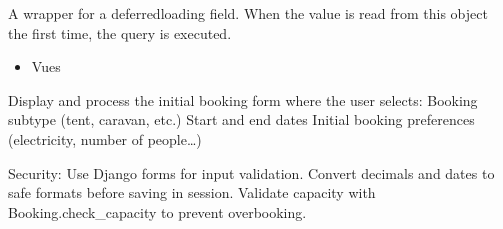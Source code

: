 \documentclass[letterpaper,10pt,english]{sphinxmanual}
\begin{document}
\begin{fulllineitems}
\begin{fulllineitems}
\label{\detokenize{index:bookings.models.SupplementMobileHomeTranslation.mobile_home_deposit}}
\pysigstartsignatures
\pysigline
{}
\pysigstopsignatures
\sphinxAtStartPar
A wrapper for a deferred\sphinxhyphen{}loading field. When the value is read from this
object the first time, the query is executed.

\end{fulllineitems}


\begin{fulllineitems}
\label{\detokenize{index:bookings.models.SupplementMobileHomeTranslation.objects}}
\pysigstartsignatures
\pysigline
{}
\pysigstopsignatures
\end{fulllineitems}


\end{fulllineitems}

\begin{itemize}
\item {} 
\sphinxAtStartPar
Vues

\end{itemize}
\label{\detokenize{index:module-bookings.views}}

\begin{fulllineitems}
\label{\detokenize{index:bookings.views.booking_form}}
\pysigstartsignatures
\pysiglinewithargsret
{}
{}
{}
\pysigstopsignatures
\sphinxAtStartPar
Display and process the initial booking form where the user selects:
\sphinxhyphen{} Booking subtype (tent, caravan, etc.)
\sphinxhyphen{} Start and end dates
\sphinxhyphen{} Initial booking preferences (electricity, number of people…)

\sphinxAtStartPar
Security:
\sphinxhyphen{} Use Django forms for input validation.
\sphinxhyphen{} Convert decimals and dates to safe formats before saving in session.
\sphinxhyphen{} Validate capacity with Booking.check\_capacity to prevent overbooking.

\end{fulllineitems}
\end{document}
